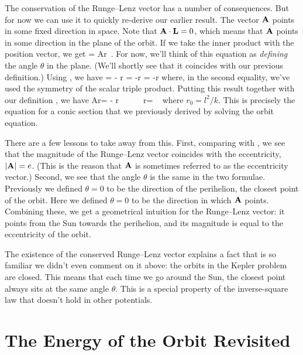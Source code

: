 {\para
The conservation of the Runge--Lenz vector has a number of consequences. But for now we can use it to quickly re-derive our earlier result. The vector ${\bf A}$ points in some fixed direction in space. Note that ${\bf A}\cdot {\bf L}=0$, which means that ${\bf A}$ points in some direction in the plane of the orbit. If we take the inner product with the position vector, we get
%
\cdot\bx= Ar\cos\theta\ .\label{rltheta}\ee
%
For now, we'll think of this equation as {\it defining} the angle $\theta$ in the plane. (We'll shortly see that it coincides with our previous definition.) Using , we have
%
\cdot \bx  =  - r = -r = -r\ee
%
where, in the second equality, we've used the symmetry of the scalar triple product. Putting this result together with our definition , we have
%
\be Ar\cos\theta =   - r\ \ \ \Longrightarrow\ \ \ r= \ \label{rlconic}\ee
%
where $r_0=l^2/k$. This is precisely the equation for a conic section  that we previously derived by solving the orbit equation.

\para
There are a few lessons to take away from this. First, comparing  with , we see that the magnitude of the Runge--Lenz vector coincides with the eccentricity, $|{\bf A}| = e$. (This is the reason that ${\bf A}$ is sometimes referred to as the eccentricity vector.) Second, we see that the angle $\theta$ is the same in the two formulae. Previously we defined $\theta=0$ to be the direction of the perihelion, the closest point of the orbit. Here we defined $\theta=0$ to be the direction in which ${\bf A}$ points. Combining these, we get a geometrical intuition for the Runge--Lenz vector: it points from the Sun towards the perihelion, and its magnitude is equal to the eccentricity of the orbit.

\para
The existence of the conserved Runge--Lenz vector explains a fact that is so familiar we didn't even comment on it above: the orbits in the Kepler problem are closed. This means that each time we go around the Sun, the closest point always sits at the same angle $\theta$. This is a special property of the inverse-square law that doesn't hold in other potentials. 
}


\newpage
\section{The Energy of the Orbit Revisited}

